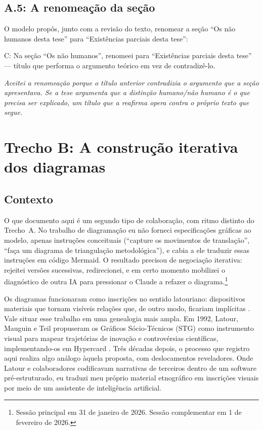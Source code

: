 \bigskip

\subsection*{A.5: A renomeação da seção}

O modelo propôs, junto com a revisão do texto, renomear a seção ``Os não humanos desta tese'' para ``Existências parciais desta tese'':

\begin{faladaC}
C: Na seção ``Os não humanos'', renomeei para ``Existências parciais desta tese'' --- título que performa o argumento teórico em vez de contradizê-lo.
\end{faladaC}

\noindent\emph{Aceitei a renomeação porque o título anterior contradizia o argumento que a seção apresentava. Se a tese argumenta que a distinção humano/não humano é o que precisa ser explicado, um título que a reafirma opera contra o próprio texto que segue.}



\section*{Trecho B: A construção iterativa dos diagramas}

\subsection*{Contexto}

O que documento aqui é um segundo tipo de colaboração, com ritmo distinto do Trecho~A. No trabalho de diagramação eu não forneci especificações gráficas ao modelo, apenas instruções conceituais (``capture os movimentos de translação'', ``faça um diagrama de triangulação metodológica''), e cabia a ele traduzir essas instruções em código Mermaid. O resultado precisou de negociação iterativa: rejeitei versões sucessivas, redirecionei, e em certo momento mobilizei o diagnóstico de outra IA para pressionar o Claude a refazer o diagrama.\footnote{Sessão principal em 31 de janeiro de 2026. Sessão complementar em 1 de fevereiro de 2026.}

Os diagramas funcionaram como inscrições no sentido latouriano: dispositivos materiais que tornam visíveis relações que, de outro modo, ficariam implícitas \parencite[pp.~81--82]{Latour2017Esperanca}. Vale situar esse trabalho em uma genealogia mais ampla. Em 1992, Latour, Mauguin e Teil propuseram os Gráficos Sócio-Técnicos (STG) como instrumento visual para mapear trajetórias de inovação e controvérsias científicas, implementando-os em Hypercard \parencite{LatourMauguinTeil1992}. Três décadas depois, o processo que registro aqui realiza algo análogo àquela proposta, com deslocamentos reveladores. Onde Latour e colaboradores codificavam narrativas de terceiros dentro de um software pré-estruturado, eu traduzi meu próprio material etnográfico em inscrições visuais por meio de um assistente de inteligência artificial.


